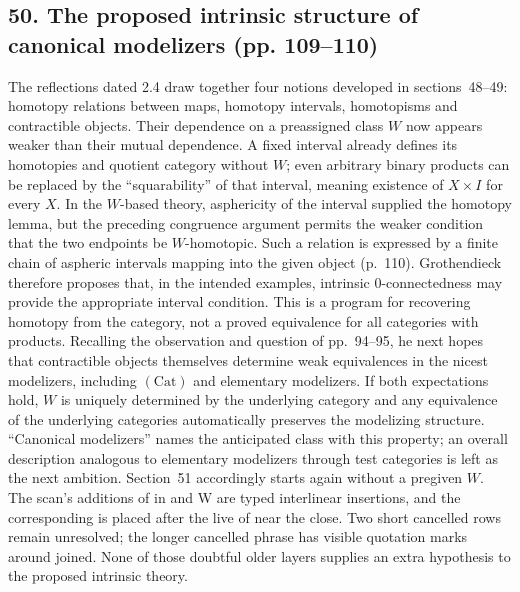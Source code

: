 \subsection*{50. The proposed intrinsic structure of canonical modelizers (pp. 109--110)}
The reflections dated 2.4 draw together four notions developed in sections~48--49: homotopy relations between maps, homotopy intervals, homotopisms and contractible objects. Their dependence on a preassigned class $W$ now appears weaker than their mutual dependence. A fixed interval already defines its homotopies and quotient category without $W$; even arbitrary binary products can be replaced by the ``squarability'' of that interval, meaning existence of $X\times I$ for every $X$. In the $W$-based theory, asphericity of the interval supplied the homotopy lemma, but the preceding congruence argument permits the weaker condition that the two endpoints be $W$-homotopic. Such a relation is expressed by a finite chain of aspheric intervals mapping into the given object (p.~110). Grothendieck therefore proposes that, in the intended examples, intrinsic $0$-connectedness may provide the appropriate interval condition. This is a program for recovering homotopy from the category, not a proved equivalence for all categories with products. Recalling the observation and question of pp.~94--95, he next hopes that contractible objects themselves determine weak equivalences in the nicest modelizers, including $(\mathrm{Cat})$ and elementary modelizers. If both expectations hold, $W$ is uniquely determined by the underlying category and any equivalence of the underlying categories automatically preserves the modelizing structure. ``Canonical modelizers'' names the anticipated class with this property; an overall description analogous to elementary modelizers through test categories is left as the next ambition. Section~51 accordingly starts again without a pregiven $W$. The scan's additions of in and W are typed interlinear insertions, and the corresponding is placed after the live of near the close. Two short cancelled rows remain unresolved; the longer cancelled phrase has visible quotation marks around joined. None of those doubtful older layers supplies an extra hypothesis to the proposed intrinsic theory.

